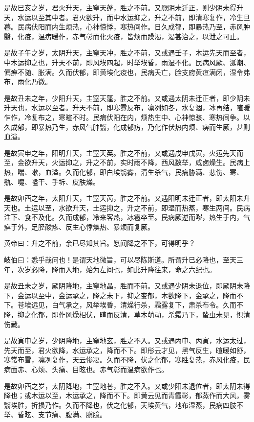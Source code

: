 \documentclass{article}%
\begin{document}
是故巳亥之岁，君火升天，主窒天蓬，胜之不前。又厥阴未迁正，则少阴未得升天，水运以至其中者。君火欲升，而中水运抑之，升之不前，即清寒复作，冷生旦暮。民病伏阳而内生烦热，心神惊悸，寒热间作。日久成郁，即暴热乃至，赤风肿翳，化疫，温疠暖作，赤气彰而化火疫，皆烦而躁渴，渴甚治之，以泄之可止。

是故子午之岁，太阴升天，主窒天冲，胜之不前，又或遇壬子，木运先天而至者，中木运抑之也，升天不前，即风埃四起，时举埃昏，雨湿不化。民病风厥、涎潮、偏痹不随、胀满。久而伏郁，即黄埃化疫也，民病夭亡，脸支府黄疸满闭，湿令弗布，雨化乃微。

是故丑未之年，少阳升天，主窒天蓬，胜之不前。又或遇太阴未迁正者，即少阴未升天也，水运以至者。升天不前，即寒雰反布，凛冽如冬，水复涸，冰再结，喧暖乍作，冷复布之，寒暄不时。民病伏阳在内，烦热生中、心神惊骇、寒热间争。以久成郁，即暴热乃生，赤风气肿翳，化成郁疠，乃化作伏热内烦、痹而生厥，甚则血溢。

是故寅申之年，阳明升天，主窒天英。胜之不前，又或遇戊申戊寅，火运先天而至，金欲升天，火运抑之，升之不前，实时雨不降，西风数举，咸卤燥生。民病上热，喘、嗽，血溢。久而化郁，即白埃翳雾，清生杀气，民病胁满、悲伤、寒、鼽、嚏、嗌干、手坼、皮肤燥。

是故卯酉之年，太阳升天，主窒天芮，胜之不前。又遇阳明未迁正者，即太阳未升天也。土运以至，水欲升天，土运抑之，升之不前，即湿而热蒸，寒生两间。民病注下、食不及化。久而成郁，冷来客热，冰雹卒至。民病厥逆而哕，热生于内，气痹于外，足胫酸疼、反生心悸燠热、暴烦而复厥。

黄帝曰：升之不前，余已尽知其旨。愿闻降之不下，可得明乎？

岐伯曰：悉乎哉问也！是谓天地微旨，可以尽陈斯道。所谓升已必降也，至天三年，次岁必降，降而入地，始为左间也，如此升降往来，命之六纪也。

是故丑未之岁，厥阴降地，主窒地晶，胜而不前。又或遇少阴未退位，即厥阴未降下，金运以至中，金运承之，降之未下，抑之变郁，木欲降下，金承之，降而不下。苍埃远见，白气承之，风举埃昏，清燥行杀，霜露复下，肃杀布令。久而不降，抑之化郁，即作风燥相伏，暄而反清，草木萌动，杀霜乃下，蛰虫未见，惧清伤藏。

是故寅申之岁，少阴降地，主窒地玄，胜之不入。又或遇丙申、丙寅，水运太过，先天而至，君火欲降，水运承之，降而不下。即彤云才见，黑气反生，暄暖如舒，寒常布雪，凛冽复作，天云惨凄。久而不降，伏之化郁，寒胜复热，赤风化疫，民病面赤、心烦、头痛、目眩也。赤气彰而温病欲作也。

是故卯酉之岁，太阴降地，主窒地苍，胜之不入。又或少阳未退位者，即太阴未得降也；或木运以至，木运承之，降而不下。即黄云见而青霞彰，郁蒸作而大风，雾翳埃胜，折损乃作。久而不降也，伏之化郁，天埃黄气，地布湿蒸，民病四肢不举、昏眩、支节痛、腹满、䐜臆。
\end{document}
